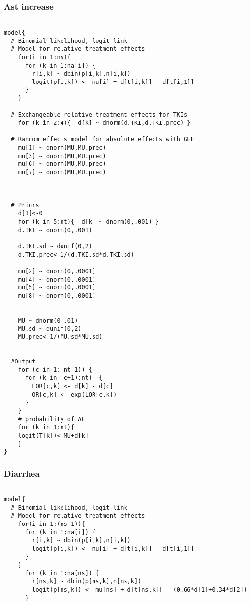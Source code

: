 \documentclass[11pt,final,fleqn]{article}\usepackage[]{graphicx}\usepackage[]{color}
\theoremstyle{plain}
\begin{document}
\begin{appendices}
\begin{verbatim}
\end{verbatim}

\subsubsection{Ast increase} 
\begin{verbatim} 

model{
  # Binomial likelihood, logit link
  # Model for relative treatment effects
    for(i in 1:ns){                  
      for (k in 1:na[i]) {               
        r[i,k] ~ dbin(p[i,k],n[i,k])     
        logit(p[i,k]) <- mu[i] + d[t[i,k]] - d[t[i,1]]  
      }
    }   
  
  # Exchangeable relative treatment effects for TKIs
    for (k in 2:4){  d[k] ~ dnorm(d.TKI,d.TKI.prec) }
  
  # Random effects model for absolute effects with GEF
    mu[1] ~ dnorm(MU,MU.prec) 
    mu[3] ~ dnorm(MU,MU.prec) 
    mu[6] ~ dnorm(MU,MU.prec) 
    mu[7] ~ dnorm(MU,MU.prec)
    
       
       
  # Priors
    d[1]<-0                                      
    for (k in 5:nt){  d[k] ~ dnorm(0,.001) }     
    d.TKI ~ dnorm(0,.001)
    
    d.TKI.sd ~ dunif(0,2) 
    d.TKI.prec<-1/(d.TKI.sd*d.TKI.sd)
    
    mu[2] ~ dnorm(0,.0001)                     
    mu[4] ~ dnorm(0,.0001)                       
    mu[5] ~ dnorm(0,.0001)                       
    mu[8] ~ dnorm(0,.0001)                       
                     
      
    MU ~ dnorm(0,.01)                         
    MU.sd ~ dunif(0,2) 
    MU.prec<-1/(MU.sd*MU.sd)
    
      
  #Output                                       
    for (c in 1:(nt-1)) {                        
      for (k in (c+1):nt)  { 
        LOR[c,k] <- d[k] - d[c]
        OR[c,k] <- exp(LOR[c,k])
      }  
    }
    # probability of AE
    for (k in 1:nt){ 
    logit(T[k])<-MU+d[k]
    }
}

\end{verbatim}

\subsubsection{Diarrhea} 
\begin{verbatim} 

model{
  # Binomial likelihood, logit link
  # Model for relative treatment effects
    for(i in 1:(ns-1)){                  
      for (k in 1:na[i]) {              
        r[i,k] ~ dbin(p[i,k],n[i,k])     
        logit(p[i,k]) <- mu[i] + d[t[i,k]] - d[t[i,1]]  
      }
    }   
      for (k in 1:na[ns]) {               
        r[ns,k] ~ dbin(p[ns,k],n[ns,k])     
        logit(p[ns,k]) <- mu[ns] + d[t[ns,k]] - (0.66*d[1]+0.34*d[2])  
      }
  

\end{verbatim}
\end{appendices}
\end{document}

